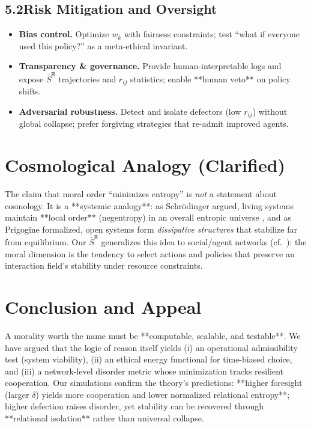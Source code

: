 \documentclass[11pt,a4paper]{article}
\begin{document}
\subsection*{5.2\quad Risk Mitigation and Oversight}
\begin{itemize}
  \item \textbf{Bias control.} Optimize $w_k$ with fairness constraints; test “what if everyone used this policy?” as a meta-ethical invariant.
  \item \textbf{Transparency \& governance.} Provide human-interpretable logs and expose $\bar S^{\mathsf{R}}$ trajectories and $r_{ij}$ statistics; enable **human veto** on policy shifts.
  \item \textbf{Adversarial robustness.} Detect and isolate defectors (low $r_{ij}$) without global collapse; prefer forgiving strategies that re-admit improved agents.
\end{itemize}

\section{Cosmological Analogy (Clarified)}
The claim that moral order “minimizes entropy” is \emph{not} a statement about cosmology. It is a **systemic analogy**: as Schrödinger argued, living systems maintain **local order** (negentropy) in an overall entropic universe \cite{Schrodinger1944}, and as Prigogine formalized, open systems form \emph{dissipative structures} that stabilize far from equilibrium. Our $\bar S^{\mathsf{R}}$ generalizes this idea to social/agent networks (cf.\ \cite{Smolin2013,England2013}): the moral dimension is the tendency to select actions and policies that preserve an interaction field’s stability under resource constraints.

\section{Conclusion and Appeal}
A morality worth the name must be **computable, scalable, and testable**. We have argued that the logic of reason itself yields (i) an operational admissibility test (system viability), (ii) an ethical energy functional for time-biased choice, and (iii) a network-level disorder metric whose minimization tracks resilient cooperation. Our simulations confirm the theory’s predictions: **higher foresight (larger $\delta$) yields more cooperation and lower normalized relational entropy**; higher defection raises disorder, yet stability can be recovered through **relational isolation** rather than universal collapse.
\end{document}
